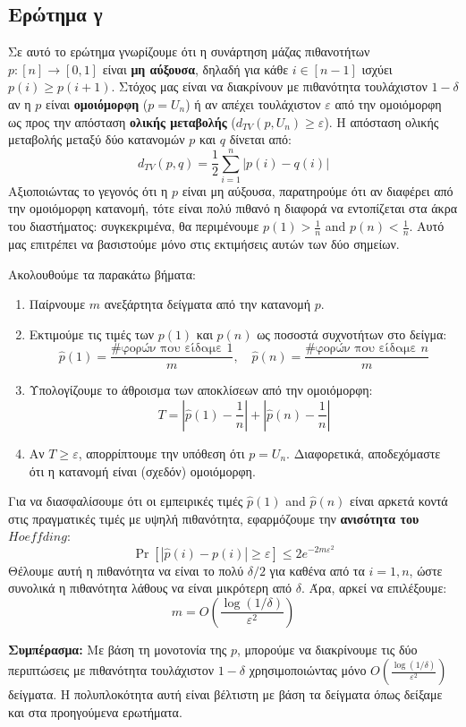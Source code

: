 \documentclass[12pt]{article}
\begin{document}
\subsection*{Ερώτημα γ}

Σε αυτό το ερώτημα γνωρίζουμε ότι η συνάρτηση μάζας πιθανοτήτων $p : [n] \rightarrow [0,1]$ είναι \textbf{μη αύξουσα}, δηλαδή για κάθε $i \in [n-1]$ ισχύει $p(i) \geq p(i+1)$. Στόχος μας είναι να διακρίνουν με πιθανότητα τουλάχιστον $1 - \delta$ αν η $p$ είναι \textbf{ομοιόμορφη} ($p = U_n$) ή αν απέχει τουλάχιστον $\varepsilon$ από την ομοιόμορφη ως προς την απόσταση \textbf{ολικής μεταβολής} ($d_{TV}(p, U_n) \geq \varepsilon$).
Η απόσταση ολικής μεταβολής μεταξύ δύο κατανομών $p$ και $q$ δίνεται από:
\[
d_{TV}(p, q) = \frac{1}{2} \sum_{i=1}^n |p(i) - q(i)|
\]
Αξιοποιώντας το γεγονός ότι η $p$ είναι μη αύξουσα, παρατηρούμε ότι αν διαφέρει από την ομοιόμορφη κατανομή, τότε είναι πολύ πιθανό η διαφορά να εντοπίζεται στα άκρα του διαστήματος: συγκεκριμένα, θα περιμένουμε $p(1) > \frac{1}{n}$ and $p(n) < \frac{1}{n}$. Αυτό μας επιτρέπει να βασιστούμε μόνο στις εκτιμήσεις αυτών των δύο σημείων.

\vspace{0.5em}
Ακολουθούμε τα παρακάτω βήματα:

\begin{enumerate}
  \item Παίρνουμε $m$ ανεξάρτητα δείγματα από την κατανομή $p$.
  \item Εκτιμούμε τις τιμές των $p(1)$ και $p(n)$ ως ποσοστά συχνοτήτων στο δείγμα:
  \[
  \hat{p}(1) = \frac{\text{\# φορών που είδαμε } 1}{m}, \quad \hat{p}(n) = \frac{\text{\# φορών που είδαμε } n}{m}
  \]
  \item Υπολογίζουμε το άθροισμα των αποκλίσεων από την ομοιόμορφη:
  \[
  T = \left| \hat{p}(1) - \frac{1}{n} \right| + \left| \hat{p}(n) - \frac{1}{n} \right|
  \]
  \item Αν $T \geq \varepsilon$, απορρίπτουμε την υπόθεση ότι $p = U_n$. Διαφορετικά, αποδεχόμαστε ότι η κατανομή είναι (σχεδόν) ομοιόμορφη.
\end{enumerate}

\vspace{0.5em}
Για να διασφαλίσουμε ότι οι εμπειρικές τιμές $\hat{p}(1)$ and $\hat{p}(n)$ είναι αρκετά κοντά στις πραγματικές τιμές με υψηλή πιθανότητα, εφαρμόζουμε την \textbf{ανισότητα του $Hoeffding$}:
\[
\Pr\left[ |\hat{p}(i) - p(i)| \geq \varepsilon \right] \leq 2 e^{-2m\varepsilon^2}
\]
Θέλουμε αυτή η πιθανότητα να είναι το πολύ $\delta/2$ για καθένα από τα $i = 1, n$, ώστε συνολικά η πιθανότητα λάθους να είναι μικρότερη από $\delta$.
Άρα, αρκεί να επιλέξουμε:
\[
m = O\left( \frac{\log(1/\delta)}{\varepsilon^2} \right)
\]

\vspace{0.5em}
\noindent\textbf{Συμπέρασμα:} Με βάση τη μονοτονία της $p$, μπορούμε να διακρίνουμε τις δύο περιπτώσεις με πιθανότητα τουλάχιστον $1 - \delta$ χρησιμοποιώντας μόνο $O\left( \frac{\log(1/\delta)}{\varepsilon^2} \right)$ δείγματα. Η πολυπλοκότητα αυτή είναι βέλτιστη με βάση τα δείγματα όπως δείξαμε και στα προηγούμενα ερωτήματα.
\end{document}
